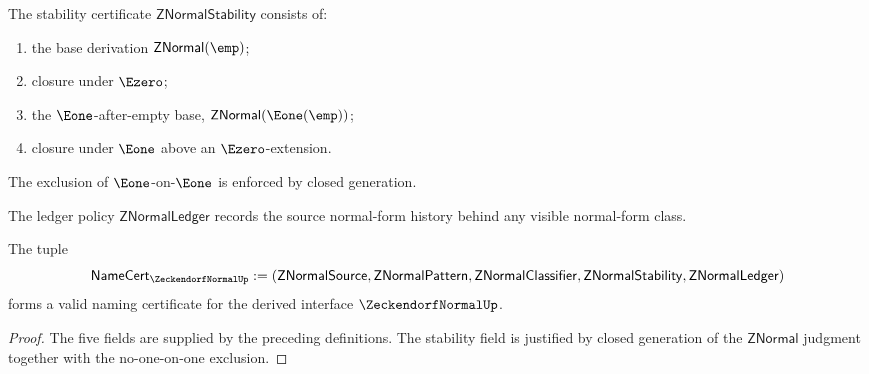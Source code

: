 \begin{definition}
\label{def:znormal-stability-certificate}
The stability certificate \(\mathsf{ZNormalStability}\) consists of:
\begin{enumerate}
  \item the base derivation \(\mathsf{ZNormal}(\emp)\);
  \item closure under \(\Ezero\);
  \item the \(\Eone\)-after-empty base, \(\mathsf{ZNormal}(\Eone(\emp))\);
  \item closure under \(\Eone\) above an \(\Ezero\)-extension.
\end{enumerate}
The exclusion of \(\Eone\)-on-\(\Eone\) is enforced by closed generation.
\end{definition}

\begin{definition}
\label{def:znormal-ledger-policy}
The ledger policy \(\mathsf{ZNormalLedger}\) records the source normal-form history behind any visible normal-form class.
\end{definition}

\begin{theorem}
\label{thm:concrete-znormal-namecert}
The tuple
$$
  \mathsf{NameCert}_{\ZeckendorfNormalUp}
  :=
  (\mathsf{ZNormalSource},
   \mathsf{ZNormalPattern},
   \mathsf{ZNormalClassifier},
   \mathsf{ZNormalStability},
   \mathsf{ZNormalLedger})
$$
forms a valid naming certificate for the derived interface $\ZeckendorfNormalUp$.
\end{theorem}
\begin{proof}
The five fields are supplied by the preceding definitions. The stability field is justified by closed generation of the \(\mathsf{ZNormal}\) judgment together with the no-one-on-one exclusion.
\end{proof}

